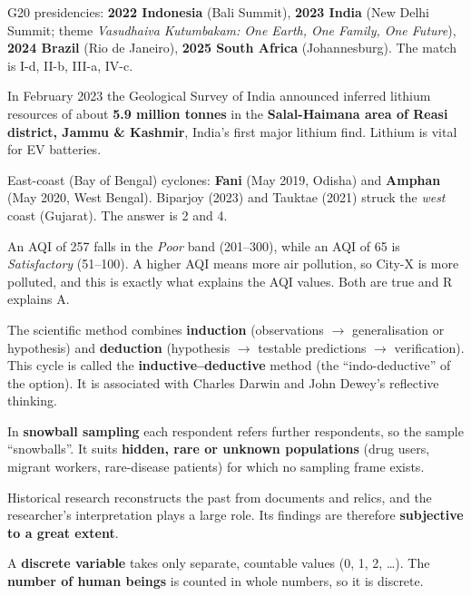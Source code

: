 G20 presidencies: \textbf{2022 Indonesia} (Bali Summit), \textbf{2023 India} (New Delhi Summit; theme \emph{Vasudhaiva Kutumbakam: One Earth, One Family, One Future}), \textbf{2024 Brazil} (Rio de Janeiro), \textbf{2025 South Africa} (Johannesburg). The match is I-d, II-b, III-a, IV-c.

In February 2023 the Geological Survey of India announced inferred lithium resources of about \textbf{5.9 million tonnes} in the \textbf{Salal-Haimana area of Reasi district, Jammu \& Kashmir}, India's first major lithium find. Lithium is vital for EV batteries.

East-coast (Bay of Bengal) cyclones: \textbf{Fani} (May 2019, Odisha) and \textbf{Amphan} (May 2020, West Bengal).
Biparjoy (2023) and Tauktae (2021) struck the \emph{west} coast (Gujarat). The answer is 2 and 4.

An AQI of 257 falls in the \emph{Poor} band (201--300), while an AQI of 65 is \emph{Satisfactory} (51--100). A higher AQI means more air pollution, so City-X is more polluted, and this is exactly what explains the AQI values. Both are true and R explains A.

The scientific method combines \textbf{induction} (observations $\rightarrow$ generalisation or hypothesis) and \textbf{deduction} (hypothesis $\rightarrow$ testable predictions $\rightarrow$ verification). This cycle is called the \textbf{inductive--deductive} method (the ``indo-deductive'' of the option). It is associated with Charles Darwin and John Dewey's reflective thinking.

In \textbf{snowball sampling} each respondent refers further respondents, so the sample ``snowballs''. It suits \textbf{hidden, rare or unknown populations} (drug users, migrant workers, rare-disease patients) for which no sampling frame exists.

Historical research reconstructs the past from documents and relics, and the researcher's interpretation plays a large role. Its findings are therefore \textbf{subjective to a great extent}.

A \textbf{discrete variable} takes only separate, countable values (0, 1, 2, \ldots). The \textbf{number of human beings} is counted in whole numbers, so it is discrete.

